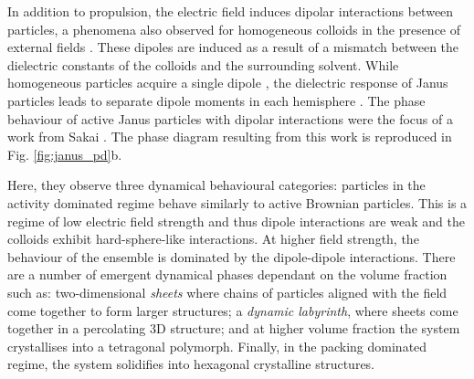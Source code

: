 In addition to propulsion, the electric field induces dipolar interactions between particles, a phenomena also observed for homogeneous colloids in the presence of external fields \cite{hynninen2005}. These dipoles are induced as a result of a mismatch between the dielectric constants of the colloids and the surrounding solvent. While homogeneous particles acquire a single dipole \cite{hynninen2005}, the dielectric response of Janus particles leads to separate dipole moments in each hemisphere \cite{yan2016}.
The phase behaviour of active Janus particles with dipolar interactions were the focus of a work from Sakai \etal \cite{sakai2020}. The phase diagram resulting from this work is reproduced in Fig. \ref{fig:janus_pd}b.


Here, they observe three dynamical behavioural categories: particles in the activity dominated regime behave similarly to active Brownian particles. This is a regime of low electric field strength and thus dipole interactions are weak and the colloids exhibit hard-sphere-like  interactions. At higher field strength, the behaviour of the ensemble is dominated by the dipole-dipole interactions. There are a number of emergent dynamical phases dependant on the volume fraction such as: two-dimensional \textit{sheets} where chains of particles aligned with the field come together to form larger structures;  a \textit{dynamic labyrinth}, where sheets come together in a percolating 3D structure; and at higher volume fraction the system crystallises into a tetragonal polymorph. Finally, in the packing dominated regime, the system solidifies into hexagonal crystalline structures.




